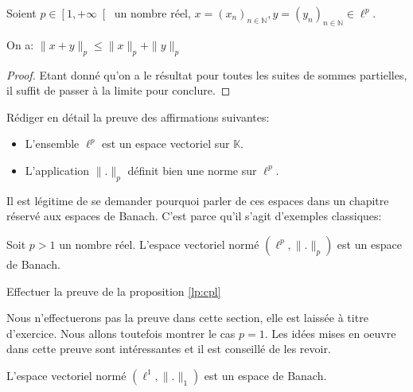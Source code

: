 \begin{thm}
  Soient $p\in\left[1, +\infty\right[$ un nombre réel,
  $x=(x_n)_{n\in\mathbb{N}}, y=(y_n)_{n\in\mathbb{N}}\in \ell^p$.

  On a:
  $\|x+y\|_p\leq \|x\|_p + \|y\|_p$
\end{thm}
\begin{proof}
  Etant donné qu'on a le résultat pour toutes les suites de
  sommes partielles, il suffit de passer à la limite
  pour conclure.
\end{proof}

\begin{exo} Rédiger en détail la preuve des affirmations suivantes:
  \begin{itemize}
  \item L'ensemble $\ell^p$ est un espace vectoriel sur $\mathbb{K}$.
  \item L'application $\|.\|_p$ définit bien une norme sur $\ell^p$.
  \end{itemize}
\end{exo}


Il est légitime de se demander pourquoi parler de ces espaces
dans un chapitre réservé aux espaces de Banach. C'est parce
qu'il s'agit d'exemples classiques:

\begin{prop}\label{lp:cpl}
  Soit $p> 1$ un nombre réel. L'espace vectoriel normé $(\ell^p, \|.\|_p)$
  est un espace de Banach.
\end{prop}

\begin{exo}
  Effectuer la preuve de la proposition \ref{lp:cpl}
\end{exo}

Nous n'effectuerons pas la preuve dans cette section, elle
est laissée à titre d'exercice. Nous allons toutefois
montrer le cas $p=1$. Les idées mises
en oeuvre dans cette preuve sont intéressantes et il est
conseillé de les revoir.

\begin{prop}
  L'espace vectoriel normé $(\ell^1, \|.\|_1)$ est un espace de Banach.
\end{prop}

